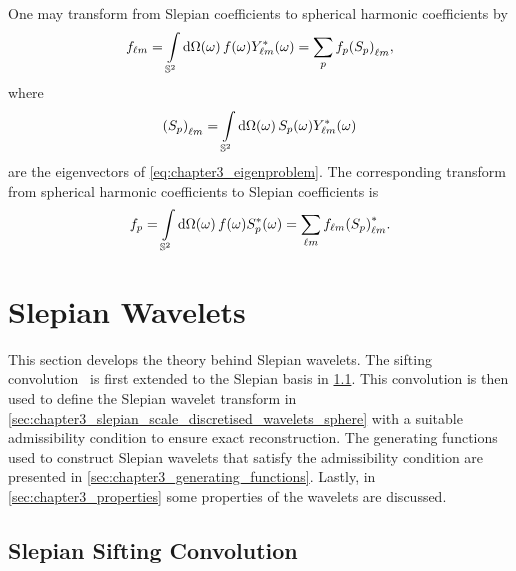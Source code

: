 One may transform from Slepian coefficients to spherical harmonic coefficients by
%
\begin{equation}
	{f}_{\ell m}
	= \int\limits_{\mathbb{S}^{2}} \dd{\Omega(\omega)} f(\omega) {Y}_{\ell m}^{\ast}(\omega)
	= \sum\limits_{p} {f}_{p}{({S}_{p})}_{\ell m},
\end{equation}
%
where
%
\begin{equation}\label{eq:chapter3_harmonic_slepian}
	{({S}_{p})}_{\ell m}
	= \int\limits_{\mathbb{S}^{2}} \dd{\Omega(\omega)} {S}_{p}(\omega) {Y}_{\ell m}^{\ast}(\omega)
\end{equation}
%
are the eigenvectors of \cref{eq:chapter3_eigenproblem}.
The corresponding transform from spherical harmonic coefficients to Slepian coefficients is
%
\begin{equation}\label{eq:chapter3_harmonic_to_slepian}
	{f}_{p}
	= \int\limits_{\mathbb{S}^{2}} \dd{\Omega(\omega)} f(\omega) {S}_{p}^{\ast}(\omega)
	= \sum\limits_{\ell m} {f}_{\ell m} {({S}_{p})}_{\ell m}^{\ast}.
\end{equation}

\section{Slepian Wavelets}\label{sec:chapter3_slepian_wavelets}

This section develops the theory behind Slepian wavelets.
The sifting convolution~\cite{Roddy2021} is first extended to the Slepian basis in \cref{sec:chapter3_slepian_sifting_convolution}.
This convolution is then used to define the Slepian wavelet transform in \cref{sec:chapter3_slepian_scale_discretised_wavelets_sphere} with a suitable admissibility condition to ensure exact reconstruction.
The generating functions used to construct Slepian wavelets that satisfy the admissibility condition are presented in \cref{sec:chapter3_generating_functions}.
Lastly, in \cref{sec:chapter3_properties} some properties of the wavelets are discussed.

\subsection{Slepian Sifting Convolution}\label{sec:chapter3_slepian_sifting_convolution}

